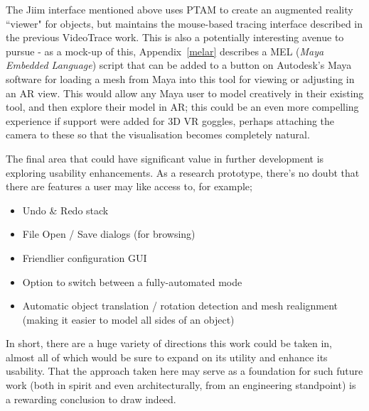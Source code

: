 \documentclass[a4paper,10pt]{article}
\begin{document}
The Jiim interface mentioned above uses PTAM to create an augmented reality ``viewer" for objects, but maintains the mouse-based tracing interface described in the previous VideoTrace work. This is also a potentially interesting avenue to pursue - as a mock-up of this, Appendix~\ref{melar} describes a MEL (\textit{Maya Embedded Language}) script that can be added to a button on Autodesk's Maya software for loading a mesh from Maya into this tool for viewing or adjusting in an AR view. This would allow any Maya user to model creatively in their existing tool, and then explore their model in AR; this could be an even more compelling experience if support were added for 3D VR goggles, perhaps attaching the camera to these so that the visualisation becomes completely natural.

The final area that could have significant value in further development is exploring usability enhancements. As a research prototype, there's no doubt that there are features a user may like access to, for example;
\begin{itemize}
\item{Undo \& Redo stack}
\item{File Open / Save dialogs (for browsing)}
\item{Friendlier configuration GUI}
\item{Option to switch between a fully-automated mode}
\item{Automatic object translation / rotation detection and mesh realignment (making it easier to model all sides of an object)}
\end{itemize}

In short, there are a huge variety of directions this work could be taken in, almost all of which would be sure to expand on its utility and enhance its usability. That the approach taken here may serve as a foundation for such future work (both in spirit and even architecturally, from an engineering standpoint) is a rewarding conclusion to draw indeed.


\clearpage
\renewcommand*{\refname}{\section{References}}



\clearpage
\appendix
\end{document}
